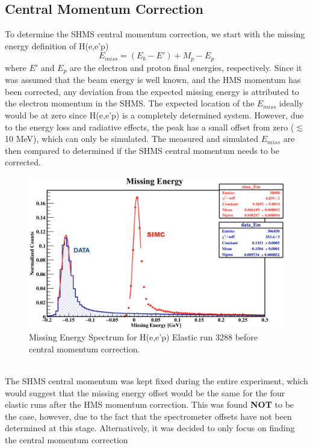 \documentclass[11pt]{article}
\begin{document}
\subsection{Central Momentum Correction}
To determine the SHMS central momentum correction, we start with the missing energy definition of H(e,e'p)
\begin{equation}
  E_{miss} = (E_{b} - E') + M_{p} - E_{p}
\end{equation}
where $E'$ and $E_{p}$ are the electron and proton final energies, respectively. Since it was assumed that
the beam energy is well known, and the HMS momentum has been corrected, any deviation from the expected missing
energy is attributed to the electron momentum in the SHMS. The expected location of the $E_{miss}$ ideally would
be at zero since H(e,e'p) is a completely determined system. However, due to the energy loss and radiative effects,
the peak has a small offset from zero ($\lesssim$10 MeV), which can only be simulated. The measured and simulated
$E_{miss}$ are then compared to determined if the SHMS central momentum needs to be corrected.
\begin{figure}[h!]
  \centering
  \includegraphics[scale=0.2]{plots/Emiss_3288_UnCorr.png}
  \caption{Missing Energy Spectrum for H(e,e'p) Elastic run 3288 before central momentum correction.}
  \label{fig:Emiss_UnCorr}
\end{figure} \\
The SHMS central momentum was kept fixed during the entire experiment, which would suggest that the missing
energy offset would be the same for the four elastic runs after the HMS momentum correction. This was found
\textbf{NOT} to be the case, however, due to the fact that the spectrometer offsets have not been determined
at this stage. Alternatively, it was decided to only focus on finding the central momentum correction
\end{document}
